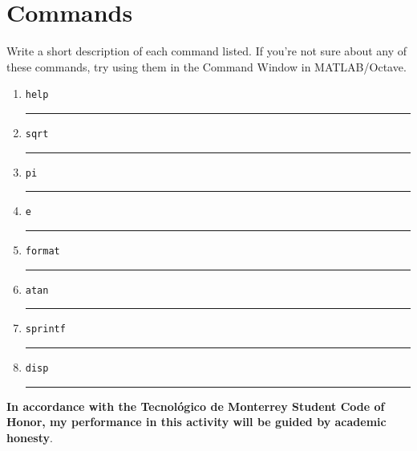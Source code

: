 \documentclass[spanish, 10pt]{article}
\newcommand{\responserule}{{\large\rule{14 cm}{0.3mm}}}
\newcommand{\matlab}[1]{\lstinline[style=Matlab-pyglike]!#1!}
\begin{document}
\section{Commands}

Write a short description of each command listed.
If you're not sure about any of these commands, try using them in the Command Window in MATLAB/Octave.

\vspace{3ex}

\begin{enumerate}[label=\alph*)]
	\large
	\item \matlab{help} \\[3ex] \responserule
	\item \matlab{sqrt} \\[3ex] \responserule
	\item \matlab{pi} \\[3ex] \responserule
	\item \matlab{e} \\[3ex] \responserule
	\item \matlab{format} \\[3ex] \responserule
	\item \matlab{atan} \\[3ex] \responserule
	\item \matlab{sprintf} \\[3ex] \responserule
	\item \matlab{disp} \\[3ex] \responserule
\end{enumerate}

\vfill

\textbf{In accordance with the Tecnológico de Monterrey Student Code of Honor, my performance in this activity will be guided by academic honesty}.
\end{document}
